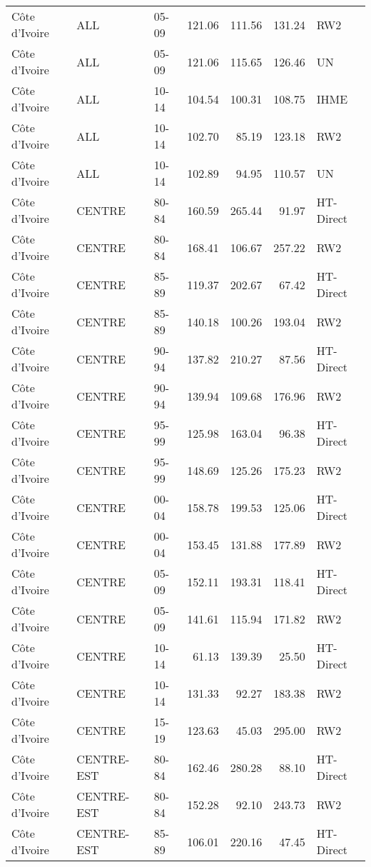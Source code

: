 \begin{longtable}{lllrrrl}
  C\^{o}te d'Ivoire & ALL & 05-09 & 121.06 & 111.56 & 131.24 & RW2 \\ 
  C\^{o}te d'Ivoire & ALL & 05-09 & 121.06 & 115.65 & 126.46 & UN \\ 
  C\^{o}te d'Ivoire & ALL & 10-14 & 104.54 & 100.31 & 108.75 & IHME \\ 
  C\^{o}te d'Ivoire & ALL & 10-14 & 102.70 & 85.19 & 123.18 & RW2 \\ 
  C\^{o}te d'Ivoire & ALL & 10-14 & 102.89 & 94.95 & 110.57 & UN \\ 
  C\^{o}te d'Ivoire & CENTRE & 80-84 & 160.59 & 265.44 & 91.97 & HT-Direct \\ 
  C\^{o}te d'Ivoire & CENTRE & 80-84 & 168.41 & 106.67 & 257.22 & RW2 \\ 
  C\^{o}te d'Ivoire & CENTRE & 85-89 & 119.37 & 202.67 & 67.42 & HT-Direct \\ 
  C\^{o}te d'Ivoire & CENTRE & 85-89 & 140.18 & 100.26 & 193.04 & RW2 \\ 
  C\^{o}te d'Ivoire & CENTRE & 90-94 & 137.82 & 210.27 & 87.56 & HT-Direct \\ 
  C\^{o}te d'Ivoire & CENTRE & 90-94 & 139.94 & 109.68 & 176.96 & RW2 \\ 
  C\^{o}te d'Ivoire & CENTRE & 95-99 & 125.98 & 163.04 & 96.38 & HT-Direct \\ 
  C\^{o}te d'Ivoire & CENTRE & 95-99 & 148.69 & 125.26 & 175.23 & RW2 \\ 
  C\^{o}te d'Ivoire & CENTRE & 00-04 & 158.78 & 199.53 & 125.06 & HT-Direct \\ 
  C\^{o}te d'Ivoire & CENTRE & 00-04 & 153.45 & 131.88 & 177.89 & RW2 \\ 
  C\^{o}te d'Ivoire & CENTRE & 05-09 & 152.11 & 193.31 & 118.41 & HT-Direct \\ 
  C\^{o}te d'Ivoire & CENTRE & 05-09 & 141.61 & 115.94 & 171.82 & RW2 \\ 
  C\^{o}te d'Ivoire & CENTRE & 10-14 & 61.13 & 139.39 & 25.50 & HT-Direct \\ 
  C\^{o}te d'Ivoire & CENTRE & 10-14 & 131.33 & 92.27 & 183.38 & RW2 \\ 
  C\^{o}te d'Ivoire & CENTRE & 15-19 & 123.63 & 45.03 & 295.00 & RW2 \\ 
  C\^{o}te d'Ivoire & CENTRE-EST & 80-84 & 162.46 & 280.28 & 88.10 & HT-Direct \\ 
  C\^{o}te d'Ivoire & CENTRE-EST & 80-84 & 152.28 & 92.10 & 243.73 & RW2 \\ 
  C\^{o}te d'Ivoire & CENTRE-EST & 85-89 & 106.01 & 220.16 & 47.45 & HT-Direct \\ 

\end{longtable}
